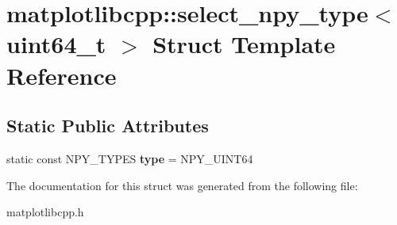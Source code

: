 \hypertarget{structmatplotlibcpp_1_1select__npy__type_3_01uint64__t_01_4}{}\section{matplotlibcpp\+:\+:select\+\_\+npy\+\_\+type$<$ uint64\+\_\+t $>$ Struct Template Reference}
\label{structmatplotlibcpp_1_1select__npy__type_3_01uint64__t_01_4}
\subsection*{Static Public Attributes}
\begin{DoxyCompactItemize}
\item 
\mbox{\label{structmatplotlibcpp_1_1select__npy__type_3_01uint64__t_01_4_a8d5871452f90ff04452f0416bee54fca}} 
static const N\+P\+Y\+\_\+\+T\+Y\+P\+ES {\bfseries type} = N\+P\+Y\+\_\+\+U\+I\+N\+T64
\end{DoxyCompactItemize}


The documentation for this struct was generated from the following file\+:\begin{DoxyCompactItemize}
\item 
matplotlibcpp.\+h\end{DoxyCompactItemize}
